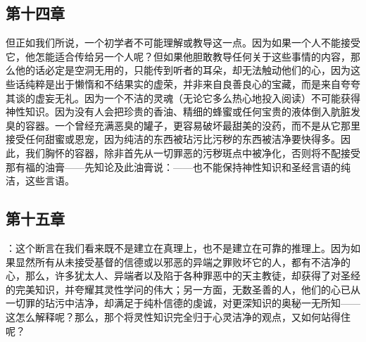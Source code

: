 
\subsection{第十四章}

\par

但正如我们所说，一个初学者不可能理解或教导这一点。因为如果一个人不能接受它，他怎能适合传给另一个人呢？但如果他胆敢教导任何关于这些事情的内容，那么他的话必定是空洞无用的，只能传到听者的耳朵，却无法触动他们的心，因为这些话纯粹是出于懒惰和不结果实的虚荣，并非来自良善良心的宝藏，而是来自夸夸其谈的虚妄无礼。因为一个不洁的灵魂（无论它多么热心地投入阅读）不可能获得神性知识。因为没有人会把珍贵的香油、精细的蜂蜜或任何宝贵的液体倒入肮脏发臭的容器。一个曾经充满恶臭的罐子，更容易破坏最甜美的没药，而不是从它那里接受任何甜蜜或恩宠，因为纯洁的东西被玷污比污秽的东西被洁净要快得多。因此，我们胸怀的容器，除非首先从一切罪恶的污秽斑点中被净化，否则将不配接受那有福的油膏——先知论及此油膏说：——也不能保持神性知识和圣经言语的纯洁，这些言语。\par


\subsection{第十五章}

\par

：这个断言在我们看来既不是建立在真理上，也不是建立在可靠的推理上。因为如果显然所有从未接受基督的信德或以邪恶的异端之罪败坏它的人，都有不洁净的心，那么，许多犹太人、异端者以及陷于各种罪恶中的天主教徒，却获得了对圣经的完美知识，并夸耀其灵性学问的伟大；另一方面，无数圣善的人，他们的心已从一切罪的玷污中洁净，却满足于纯朴信德的虔诚，对更深知识的奥秘一无所知——这怎么解释呢？那么，那个将灵性知识完全归于心灵洁净的观点，又如何站得住呢？\par


